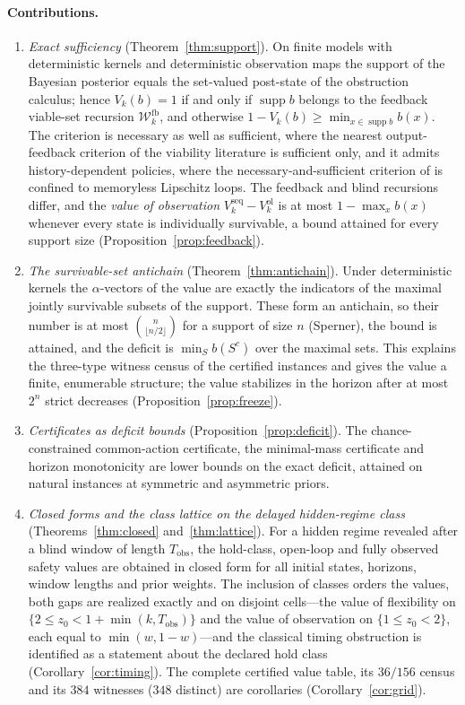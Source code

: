 \documentclass[11pt,a4paper]{article}
\theoremstyle{plain}
\theoremstyle{definition}
\theoremstyle{remark}
\newcommand{\calW}{\mathcal{W}}
\newcommand{\Wfb}{\calW^{\mathrm{fb}}}
\newcommand{\supp}{\operatorname{supp}}
\newcommand{\ol}{\mathrm{ol}}
\newcommand{\seq}{\mathrm{seq}}
\newcommand{\Tobs}{T_{\mathrm{obs}}}
\begin{document}
\paragraph{Contributions.}
\begin{enumerate}[leftmargin=1.6em,itemsep=1pt]
\item \emph{Exact sufficiency} (Theorem~\ref{thm:support}). On finite models with deterministic kernels and deterministic observation maps the support of the Bayesian posterior equals the set-valued post-state of the obstruction calculus; hence $V_k(b)=1$ if and only if $\supp b$ belongs to the feedback viable-set recursion $\Wfb_k$, and otherwise $1-V_k(b)\ge\min_{x\in\supp b}b(x)$. The criterion is necessary as well as sufficient, where the nearest output-feedback criterion of the viability literature \cite{Veliov1993} is sufficient only, and it admits history-dependent policies, where the necessary-and-sufficient criterion of \cite{Doyen2000} is confined to memoryless Lipschitz loops. The feedback and blind recursions differ, and the \emph{value of observation} $V^{\seq}_k-V^{\ol}_k$ is at most $1-\max_x b(x)$ whenever every state is individually survivable, a bound attained for every support size (Proposition~\ref{prop:feedback}).
\item \emph{The survivable-set antichain} (Theorem~\ref{thm:antichain}). Under deterministic kernels the $\alpha$-vectors of the value are exactly the indicators of the maximal jointly survivable subsets of the support. These form an antichain, so their number is at most $\binom{n}{\lfloor n/2\rfloor}$ for a support of size $n$ (Sperner), the bound is attained, and the deficit is $\min_S b(S^{c})$ over the maximal sets. This explains the three-type witness census of the certified instances and gives the value a finite, enumerable structure; the value stabilizes in the horizon after at most $2^{n}$ strict decreases (Proposition~\ref{prop:freeze}).
\item \emph{Certificates as deficit bounds} (Proposition~\ref{prop:deficit}). The chance-constrained common-action certificate, the minimal-mass certificate and horizon monotonicity are lower bounds on the exact deficit, attained on natural instances at symmetric and asymmetric priors.
\item \emph{Closed forms and the class lattice on the delayed hidden-regime class} (Theorems~\ref{thm:closed} and~\ref{thm:lattice}). For a hidden regime revealed after a blind window of length $\Tobs$, the hold-class, open-loop and fully observed safety values are obtained in closed form for all initial states, horizons, window lengths and prior weights. The inclusion of classes orders the values, both gaps are realized exactly and on disjoint cells---the value of flexibility on $\{2\le z_0<1+\min(k,\Tobs)\}$ and the value of observation on $\{1\le z_0<2\}$, each equal to $\min(w,1-w)$---and the classical timing obstruction is identified as a statement about the declared hold class (Corollary~\ref{cor:timing}). The complete certified value table, its $36/156$ census and its $384$ witnesses ($348$ distinct) are corollaries (Corollary~\ref{cor:grid}).

\end{enumerate}
\end{document}
